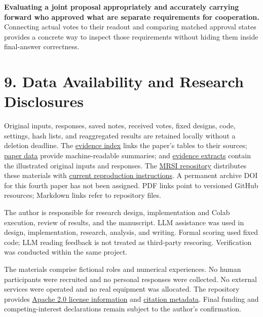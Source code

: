 \documentclass[10pt,a4paper]{article}
\begin{document}
\textbf{Evaluating a joint proposal appropriately and accurately carrying forward who approved what are separate requirements for cooperation.} Connecting actual votes to their readout and comparing matched approval states provides a concrete way to inspect those requirements without hiding them inside final-answer correctness.

\section{9. Data Availability and Research Disclosures}\label{paper-04-data-availability-and-research-disclosures}

Original inputs, responses, saved notes, received votes, fixed designs, code, settings, hash lists, and reaggregated results are retained locally without a deletion deadline. The \href{https://github.com/metaSATOKEN/MRSI/blob/9443de315d283874df0c27e0e99b8c04f400709d/papers/paper-04/evidence-index-en-v0.1-2026-10-13.md}{evidence index} links the paper's tables to their sources; \href{https://github.com/metaSATOKEN/MRSI/blob/9443de315d283874df0c27e0e99b8c04f400709d/papers/paper-04/paper-data-v0.1-2026-10-13.json}{paper data} provide machine-readable summaries; and \href{https://github.com/metaSATOKEN/MRSI/blob/9443de315d283874df0c27e0e99b8c04f400709d/papers/paper-04/evidence-extract-v0.1-2026-10-13.json}{evidence extracts} contain the illustrated original inputs and responses. The \href{https://github.com/metaSATOKEN/MRSI}{MRSI repository} distributes these materials with \href{https://github.com/metaSATOKEN/MRSI/blob/9443de315d283874df0c27e0e99b8c04f400709d/RUNNING.md}{current reproduction instructions}. A permanent archive DOI for this fourth paper has not been assigned. PDF links point to versioned GitHub resources; Markdown links refer to repository files.

The author is responsible for research design, implementation and Colab execution, review of results, and the manuscript. LLM assistance was used in design, implementation, research, analysis, and writing. Formal scoring used fixed code; LLM reading feedback is not treated as third-party rescoring. Verification was conducted within the same project.

The materials comprise fictional roles and numerical experiences. No human participants were recruited and no personal responses were collected. No external services were operated and no real equipment was allocated. The repository provides \href{https://github.com/metaSATOKEN/MRSI/blob/9443de315d283874df0c27e0e99b8c04f400709d/LICENSE_STATUS.md}{Apache 2.0 license information} and \href{https://github.com/metaSATOKEN/MRSI/blob/9443de315d283874df0c27e0e99b8c04f400709d/CITATION.cff}{citation metadata}. Final funding and competing-interest declarations remain subject to the author's confirmation.
\end{document}
